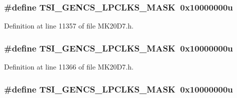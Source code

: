 \subsubsection[{\texorpdfstring{T\+S\+I\+\_\+\+G\+E\+N\+C\+S\+\_\+\+L\+P\+C\+L\+K\+S\+\_\+\+M\+A\+SK}{TSI_GENCS_LPCLKS_MASK}}]{\setlength{\rightskip}{0pt plus 5cm}\#define T\+S\+I\+\_\+\+G\+E\+N\+C\+S\+\_\+\+L\+P\+C\+L\+K\+S\+\_\+\+M\+A\+SK~0x10000000u}\hypertarget{group___t_s_i___register___masks_ga10761aaf1cd7148018bd3ae41583e66c}{}\label{group___t_s_i___register___masks_ga10761aaf1cd7148018bd3ae41583e66c}


Definition at line 11357 of file M\+K20\+D7.\+h.

\subsubsection[{\texorpdfstring{T\+S\+I\+\_\+\+G\+E\+N\+C\+S\+\_\+\+L\+P\+C\+L\+K\+S\+\_\+\+M\+A\+SK}{TSI_GENCS_LPCLKS_MASK}}]{\setlength{\rightskip}{0pt plus 5cm}\#define T\+S\+I\+\_\+\+G\+E\+N\+C\+S\+\_\+\+L\+P\+C\+L\+K\+S\+\_\+\+M\+A\+SK~0x10000000u}\hypertarget{group___t_s_i___register___masks_ga10761aaf1cd7148018bd3ae41583e66c}{}\label{group___t_s_i___register___masks_ga10761aaf1cd7148018bd3ae41583e66c}


Definition at line 11366 of file M\+K20\+D7.\+h.

\subsubsection[{\texorpdfstring{T\+S\+I\+\_\+\+G\+E\+N\+C\+S\+\_\+\+L\+P\+C\+L\+K\+S\+\_\+\+M\+A\+SK}{TSI_GENCS_LPCLKS_MASK}}]{\setlength{\rightskip}{0pt plus 5cm}\#define T\+S\+I\+\_\+\+G\+E\+N\+C\+S\+\_\+\+L\+P\+C\+L\+K\+S\+\_\+\+M\+A\+SK~0x10000000u}\hypertarget{group___t_s_i___register___masks_ga10761aaf1cd7148018bd3ae41583e66c}{}\label{group___t_s_i___register___masks_ga10761aaf1cd7148018bd3ae41583e66c}


